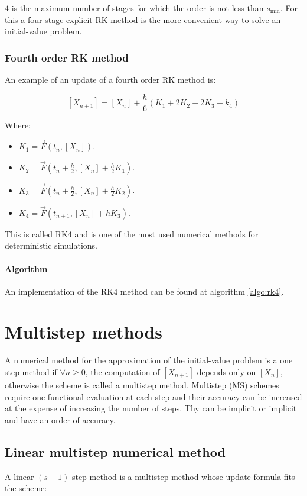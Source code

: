   $4$ is the maximum number of stages for which the order is not less than $s_{\min}$.
  For this a four-stage explicit RK method is the more convenient way to solve an initial-value problem.

    \subsubsection{Fourth order RK method}
    An example of an update of a fourth order RK method is:

    $$[X_{n+1}] = [X_n] +\frac{h}{6}(K_1+2K_2+2K_3+k_4)$$

    Where;

    \begin{multicols}{2}
      \begin{itemize}
        \item $K_1 = \vec{F}(t_n, [X_n])$.
        \item $K_2 = \vec{F}(t_n+ \frac{h}{2}, [X_n] + \frac{h}{2}K_1)$.
        \item $K_3 = \vec{F}(t_n +\frac{h}{2}, [X_n] + \frac{h}{2}K_2)$.
        \item $K_4 = \vec{F}(t_{n+1}, [X_n] + hK_3)$.
      \end{itemize}
    \end{multicols}

    This is called RK4 and is one of the most used numerical methods for deterministic simulations.

      \paragraph{Algorithm}
      An implementation of the RK4 method can be found at algorithm \ref{algo:rk4}.

      

\section{Multistep methods}
A numerical method for the approximation of the initial-value problem is a one step method if $\forall n\ge 0$, the computation of $[X_{n+1}]$ depends only on $[X_n]$, otherwise the scheme is called a multistep method.
Multistep (MS) schemes require one functional evaluation at each step and their accuracy can be increased at the expense of increasing the number of steps.
Thy can be implicit or implicit and have an order of accuracy.

  \subsection{Linear multistep numerical method}
  A linear $(s+1)$-step method is a multistep method whose update formula fits the scheme:

